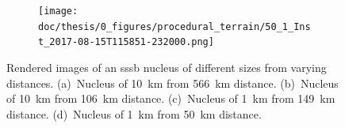 \begin{figure}[htb]
\begin{subfigure}[b]{0.48\textwidth}
        \caption{}
        \label{fig:render_quali_comparison_3}
    \end{subfigure}
    \begin{subfigure}[b]{0.48\textwidth}
        \centering
        \texttt{[image: doc/thesis/0\_figures/procedural\_terrain/50\_1\_Inst\_2017-08-15T115851-232000.png]}
        \caption{}
        \label{fig:render_quali_comparison_4}
    \end{subfigure}
    \caption{Rendered images of an \gls{sssb} nucleus of different sizes from varying distances. (a)~Nucleus of \SI{10}{\kilo\meter} from \SI{566}{\kilo\meter} distance. (b)~Nucleus of \SI{10}{\kilo\meter} from \SI{106}{\kilo\meter} distance. (c)~Nucleus of \SI{1}{\kilo\meter} from \SI{149}{\kilo\meter} distance. (d)~Nucleus of \SI{1}{\kilo\meter} from \SI{50}{\kilo\meter} distance.}
    \label{fig:render_quali_comparison}
\end{figure}

